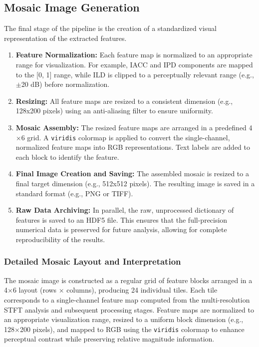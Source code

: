 \documentclass[12pt, a4paper]{article}
\begin{document}
\subsection{Mosaic Image Generation}
The final stage of the pipeline is the creation of a standardized visual representation of the extracted features.
\begin{enumerate}
    \item \textbf{Feature Normalization:} Each feature map is normalized to an appropriate range for visualization. For example, IACC and IPD components are mapped to the [0, 1] range, while ILD is clipped to a perceptually relevant range (e.g., $\pm$20 dB) before normalization.
    \item \textbf{Resizing:} All feature maps are resized to a consistent dimension (e.g., 128x200 pixels) using an anti-aliasing filter to ensure uniformity.
    \item \textbf{Mosaic Assembly:} The resized feature maps are arranged in a predefined 4$\times$6 grid. A \texttt{viridis} colormap is applied to convert the single-channel, normalized feature maps into RGB representations. Text labels are added to each block to identify the feature.
    \item \textbf{Final Image Creation and Saving:} The assembled mosaic is resized to a final target dimension (e.g., 512x512 pixels). The resulting image is saved in a standard format (e.g., PNG or TIFF).
    \item \textbf{Raw Data Archiving:} In parallel, the raw, unprocessed dictionary of features is saved to an HDF5 file. This ensures that the full-precision numerical data is preserved for future analysis, allowing for complete reproducibility of the results.
\end{enumerate}

\subsubsection{Detailed Mosaic Layout and Interpretation}
The mosaic image is constructed as a regular grid of feature blocks arranged in a 4$\times$6 layout (rows $\times$ columns), producing 24 individual tiles. Each tile corresponds to a single-channel feature map computed from the multi-resolution STFT analysis and subsequent processing stages. Feature maps are normalized to an appropriate visualization range, resized to a uniform block dimension (e.g., 128$\times$200 pixels), and mapped to RGB using the \texttt{viridis} colormap to enhance perceptual contrast while preserving relative magnitude information.
\end{document}
